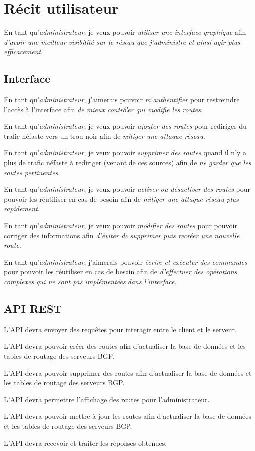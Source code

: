 \chapter{Récit utilisateur}

 En tant qu'\textit{administrateur}, je veux pouvoir \textit{utiliser une interface graphique} afin \textit{d'avoir une meilleur visibilité sur le réseau que j'administre et ainsi agir plus efficacement}.

\section{Interface}

En tant qu'\textit{administrateur}, j'aimerais pouvoir \textit{m'authentifier} pour restreindre l'accès à l'interface afin \textit{de mieux contrôler qui modifie les routes}.\bigskip

En tant qu'\textit{administrateur}, je veux pouvoir \textit{ajouter des routes} pour rediriger du trafic néfaste vers un trou noir afin de \textit{mitiger une attaque réseau}.\bigskip

En tant qu'\textit{administrateur}, je veux pouvoir \textit{supprimer des routes} quand il n'y a plus de trafic néfaste à rediriger (venant de ces sources) afin de \textit{ne garder que les routes pertinentes}.\bigskip
  
En tant qu'\textit{administrateur}, je veux pouvoir \textit{activer ou désactiver des routes} pour pouvoir les réutiliser en cas de besoin afin de \textit{mitiger une attaque réseau plus rapidement}.\bigskip

En tant qu'\textit{administrateur}, je veux pouvoir \textit{modifier des routes} pour pouvoir corriger des informations afin \textit{d'éviter de supprimer puis recréer une nouvelle route}.\bigskip

 En tant qu'\textit{administrateur}, j'aimerais pouvoir \textit{écrire et exécuter des commandes} pour pouvoir les réutiliser en cas de besoin afin de \textit{d'effectuer des opérations complexes qui ne sont pas implémentées dans l'interface}.\bigskip
 
 \newpage
 
\section{API REST}
L'API devra envoyer des requêtes pour interagir entre le client et le serveur.\bigskip

L'API devra pouvoir créer des routes afin d'actualiser la base de données et les tables de routage des serveurs BGP.\bigskip

L'API devra pouvoir supprimer des routes afin d'actualiser la base de données et les tables de routage des serveurs BGP.\bigskip

L'API devra permettre l'affichage des routes pour l'administrateur.\bigskip

L'API devra pouvoir mettre à jour les routes afin d'actualiser la base de données et les tables de routage des serveurs BGP.\bigskip

L'API devra recevoir et traiter les réponses obtenues.\bigskip
